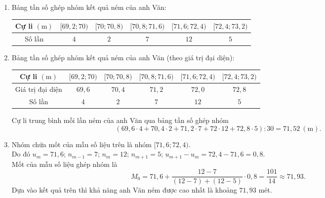 \begin{bt}
{\begin{enumerate}
\begin{center}
\begin{tabular}{|c|c|c|c|c|c|c|c|c|c|c|}
					      \hline $72{,}3$ & $71{,}5$ & $71{,}2$ & $69{,}8$ & $72{,}3$ & $71{,}1$ & $69{,}5$ & $72{,}2$ & $71{,}9$ & $73{,}1$ & $714{,}9$ \\
					      \hline $71{,}6$ & $71{,}3$ & $72{,}2$ & $71{,}8$ & $70{,}8$ & $72{,}2$ & $72{,}2$ & $72{,}9$ & $72{,}7$ & $70{,}7$ & $718{,}4$ \\
					      \hline
				      \end{tabular}
			      \end{center}
			      Cự li trung bình của mỗi lần ném của anh Văn
			      \[\overline{x}=\dfrac{713{,}6+714{,}9+718{,}4}{30}\approx71{,}56\ (\mathrm{m}). \]
			\item Bảng tần số ghép nhóm kết quả ném của anh Văn:
			      \begin{center}
				      \begin{tabular}{|c|c|c|c|c|c|}
					      \hline Cự li $(\mathrm{m})$ & {$[69{,}2; 70)$} & {$[70; 70{,}8)$} & {$[70{,}8; 71{,}6)$} & {$[71{,}6; 72{,}4)$} & {$[72{,}4; 73{,}2)$} \\
					      \hline Số lần               & $4$              & $2$              & $7$                  & $12$                 & $5$                  \\
					      \hline
				      \end{tabular}
			      \end{center}
			\item Bảng tần số ghép nhóm kết quả ném của anh Văn (theo giá trị đại diện):
			      \begin{center}
				      \begin{tabular}{|c|c|c|c|c|c|}
					      \hline Cự li $(\mathrm{m})$ & {$[69{,}2; 70)$} & {$[70; 70{,}8)$} & {$[70{,}8; 71{,}6)$} & {$[71{,}6; 72{,}4)$} & {$[72{,}4; 73{,}2)$} \\
					      \hline Giá trị đại diện     & $69{,}6$         & $70{,}4$         & $71{,}2$             & $72{,}0$             & $72{,}8$             \\
					      \hline Số lần               & $4$              & $2$              & $7$                  & $12$                 & $5$                  \\
					      \hline
				      \end{tabular}
			      \end{center}
			      Cự li trung bình mỗi lần ném của anh Văn qua bảng tần số ghép nhóm
			      \[(69{,}6\cdot 4+70{,}4\cdot 2+71{,}2\cdot 7+72\cdot 12+72{,}8\cdot 5):30=71{,}52\ (\mathrm{m}).  \]
			\item Nhóm chứa mốt của mẫu số liệu trên là nhóm $[71{,}6; 72{,}4)$.\\
			      Do đó $u_m=71{,}6$; $n_{m-1}=7$; $n_m=12$; $n_{m+1}=5$; $u_{m+1}-u_m=72{,}4-71{,}6=0{,}8$.\\
			      Mốt của mẫu số liệu ghép nhóm là
			      \[M_0=71{,}6+\dfrac{12-7}{(12-7)+(12-5)} \cdot 0{,}8=\dfrac{101}{14} \approx 71{,}93. \]
			      Dựa vào kết quả trên thì khả năng anh Văn ném được cao nhất là khoảng $71{,}93$ mét.
		\end{enumerate}
	}
\end{bt}
